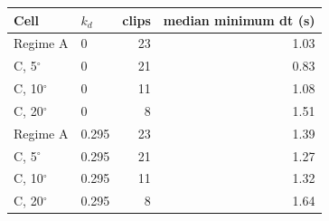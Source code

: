 \begin{tabular}{llrr}
\toprule
Cell & $k_d$ & clips & median minimum dt (s) \\
\midrule
Regime A & 0 & 23 & 1.03 \\
C, 5$^\circ$ & 0 & 21 & 0.83 \\
C, 10$^\circ$ & 0 & 11 & 1.08 \\
C, 20$^\circ$ & 0 & 8 & 1.51 \\
Regime A & 0.295 & 23 & 1.39 \\
C, 5$^\circ$ & 0.295 & 21 & 1.27 \\
C, 10$^\circ$ & 0.295 & 11 & 1.32 \\
C, 20$^\circ$ & 0.295 & 8 & 1.64 \\
\bottomrule
\end{tabular}
